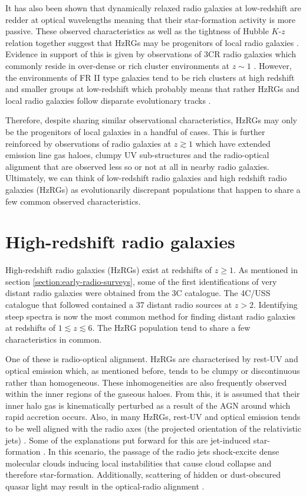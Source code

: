 It has also been shown that dynamically relaxed radio galaxies at low-redshift are redder at optical wavelengths meaning that their star-formation activity is more passive. These observed characteristics as well as the tightness of Hubble $K$-$z$ relation together suggest that HzRGs may be progenitors of local radio galaxies \citep{Stanford1998}. Evidence in support of this is given by observations of 3CR radio galaxies which commonly reside in over-dense or rich cluster environments at $z \sim 1$ \citep{Yates1989,HillLilly1991,Best2000b}. However, the environments of FR II type galaxies tend to be rich clusters at high redshift and smaller groups at low-redshift which probably means that rather HzRGs and local radio galaxies follow disparate evolutionary tracks \citep{Best1998b}. 

Therefore, despite sharing similar observational characteristics, HzRGs may only be the progenitors of local galaxies in a handful of cases. This is further reinforced by observations of radio galaxies at $z \gtrsim 1$ which have extended emission line gas haloes, clumpy UV sub-structures and the radio-optical alignment that are observed less so or not at all in nearby radio galaxies. Ultimately, we can think of low-redshift radio galaxies and high redshift radio galaxies (HzRGs) as evolutionarily discrepant populations that happen to share a few common observed characteristics.  

\section{High-redshift radio galaxies}  
High-redshift radio galaxies (HzRGs) exist at redshifts of $z \geq 1.$ As mentioned in section \ref{section:early-radio-surveys}, some of the first identifications of very distant radio galaxies were obtained from the 3C catalogue. The 4C/USS catalogue that followed contained a 37 distant radio sources at $z > 2.$ Identifying steep spectra is now the most common method for finding distant radio galaxies at redshifts of $1 \lesssim z \lesssim 6.$ The HzRG population tend to share a few characteristics in common.

One of these is radio-optical alignment. HzRGs are characterised by rest-UV and optical emission which, as mentioned before, tends to be clumpy or discontinuous rather than homogeneous. These inhomogeneities are also frequently observed within the inner regions of the gaseous haloes. From this, it is assumed that their inner halo gas is kinematically perturbed as a result of the AGN around which rapid accretion occurs. Also, in many HzRGs, rest-UV and optical emission tends to be well aligned with the radio axes (the projected orientation of the relativistic jets) \citep{Djorgovski1987,McCarthy1987b,Chambers1988b}. Some of the explanations put forward for this are jet-induced star-formation \citep{Rees1989,Bicknell2000}. In this scenario, the passage of the radio jets shock-excite dense molecular clouds inducing local instabilities that cause cloud collapse and therefore star-formation. Additionally, scattering of hidden or dust-obscured quasar light may result in the optical-radio alignment \citep{MileydeBreuck2008}.

